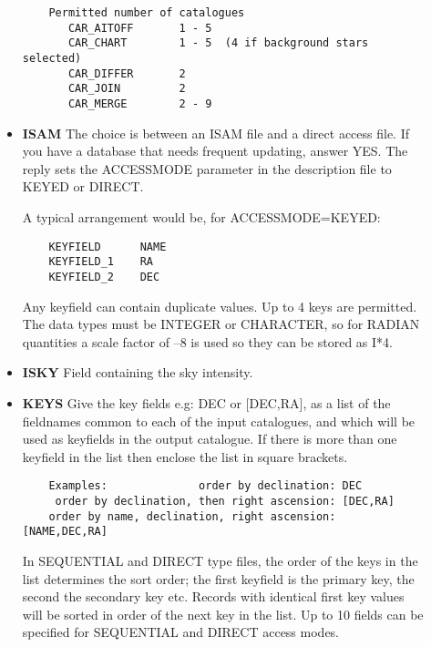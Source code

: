 \begin{description}
\begin{itemize}
\begin{verbatim}
    Permitted number of catalogues
       CAR_AITOFF       1 - 5
       CAR_CHART        1 - 5  (4 if background stars selected)
       CAR_DIFFER       2
       CAR_JOIN         2
       CAR_MERGE        2 - 9
\end{verbatim}
\item{\bf ISAM} The choice is between an ISAM file and a direct access file.
If you have a database that needs frequent updating, answer YES.
The reply sets the ACCESSMODE parameter in the description file to KEYED or
DIRECT.

A typical arrangement would be, for ACCESSMODE=KEYED:
\begin{verbatim}
    KEYFIELD      NAME
    KEYFIELD_1    RA
    KEYFIELD_2    DEC
\end{verbatim}
Any keyfield can contain duplicate values.
Up to 4 keys are permitted.
The data types must be INTEGER or CHARACTER, so for RADIAN quantities a scale
factor of --8 is used so they can be stored as I*4.
\item{\bf ISKY} Field containing the sky intensity.
\item{\bf KEYS} Give the key fields e.g: DEC or [DEC,RA], as a list of the 
fieldnames common to each of the input catalogues, and which will be used 
as keyfields in the output catalogue.
If there is more than one keyfield in the list then enclose the list in 
square brackets. 
\begin{verbatim}
    Examples:              order by declination: DEC
     order by declination, then right ascension: [DEC,RA]
    order by name, declination, right ascension: [NAME,DEC,RA]
\end{verbatim}
In SEQUENTIAL and DIRECT type files, the order of the keys in the list 
determines the sort order; the first keyfield is the primary key, the 
second the secondary key etc.  
Records with identical first key values will be sorted in order of the next 
key in the list.
Up to 10 fields can be specified for SEQUENTIAL and DIRECT access modes.


\end{itemize}
\end{description}
